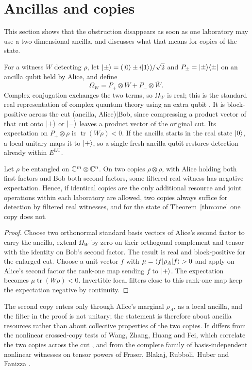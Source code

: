 \documentclass[11pt,a4paper]{article}
\theoremstyle{definition}\newtheorem{definition}[theorem]{Definition}\newtheorem*{conj}{Conjecture 9 of Shen, Chen and Bian}\newtheorem{remark}[theorem]{Remark}
\newcommand{\tr}{\operatorname{tr}}\newcommand{\im}{\operatorname{Im}}\newcommand{\adj}{\operatorname{adj}}\newcommand{\id}{\mathbb I}
\begin{document}
\section{Ancillas and copies}\label{sec:copy}
This section shows that the obstruction disappears as soon as one laboratory may use a two-dimensional ancilla, and discusses what that means for copies of the state.

For a witness $W$ detecting $\rho$, let $\lvert \pm\rangle=(\lvert 0\rangle\pm i\lvert 1\rangle)/\sqrt2$ and $P_\pm=\lvert \pm\rangle\langle \pm\rvert$ on an ancilla qubit held by Alice, and define
\begin{equation}\label{eq:flag}
 \Omega_W=P_+\otimes W+P_-\otimes\bar W .
\end{equation}
Complex conjugation exchanges the two terms, so $\Omega_W$ is real; this is the standard real representation of complex quantum theory using an extra qubit \cite{mckague,renou}. It is block-positive across the cut (ancilla, Alice)$|$Bob, since compressing a product vector of that cut onto $\lvert +\rangle$ or $\lvert -\rangle$ leaves a product vector of the original cut. Its expectation on $P_+\otimes\rho$ is $\tr(W\rho)<0$. If the ancilla starts in the real state $\lvert 0\rangle$, a local unitary maps it to $\lvert +\rangle$, so a single fresh ancilla qubit restores detection already within $E^{\mathrm{LU}}$.

\begin{prop}\label{prop:copies}
Let $\rho$ be entangled on $\mathbb C^m\otimes\mathbb C^n$. On two copies $\rho\otimes\rho$, with Alice holding both first factors and Bob both second factors, some filtered real witness has negative expectation. Hence, if identical copies are the only additional resource and joint operations within each laboratory are allowed, two copies always suffice for detection by filtered real witnesses, and for the state of Theorem~\ref{thm:one} one copy does not.
\end{prop}
\begin{proof}
Choose two orthonormal standard basis vectors of Alice's second factor to carry the ancilla, extend $\Omega_W$ by zero on their orthogonal complement and tensor with the identity on Bob's second factor. The result is real and block-positive for the enlarged cut. Choose a unit vector $f$ with $\mu=\langle f\rvert\rho_A\lvert f\rangle>0$ and apply on Alice's second factor the rank-one map sending $f$ to $\lvert +\rangle$. The expectation becomes $\mu\tr(W\rho)<0$. Invertible local filters close to this rank-one map keep the expectation negative by continuity.
\end{proof}
The second copy enters only through Alice's marginal $\rho_A$, as a local ancilla, and the filter in the proof is not unitary; the statement is therefore about ancilla resources rather than about collective properties of the two copies. It differs from the nonlinear crossed-copy tests of Wang, Zhang, Huang and Fei, which correlate the two copies across the cut \cite[Example 2]{wang}, and from the complete family of basis-independent nonlinear witnesses on tensor powers of Fraser, Blakaj, Rubboli, Huber and Fanizza \cite{fraser}.
\end{document}
